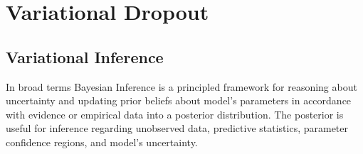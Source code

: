 \documentclass{article}
\begin{document}

\section{Variational Dropout} %
\label{sec:variational_dropout}

\subsection{Variational Inference} %
\label{sub:variational_inference}

In broad terms Bayesian Inference is a principled framework for reasoning about uncertainty
and updating prior beliefs about model's parameters in accordance with evidence or
empirical data into a posterior distribution. The posterior is useful for inference
regarding unobserved data, predictive statistics, parameter confidence regions, and
model's uncertainty.
\end{document}
